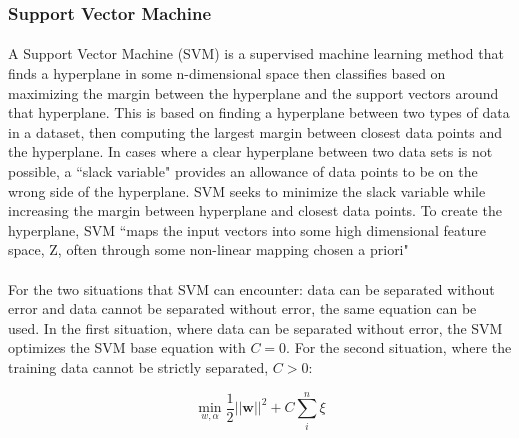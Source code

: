 \begin{comment}
			\paragraph*{}For this thesis, the counts from words in the Google Web1T corpus are used to smooth word counts in naive Bayes.  For example, the word ``dog" appears 3,450,297 time in the Web1T corpus, so the count for ``dog" is initialized to 3,450,297.  The denominator for a Google Web1T smooth naive Bayes instance is 1,024,908,267 based on total count weight of all tokens in the corpus.The specific details of the Google Web1T corpus are covered in a later section of this chapter.
\end{comment}
		\subsubsection{Support Vector Machine}
			\paragraph{}A Support Vector Machine (SVM) is a supervised machine learning method that finds a hyperplane in some n-dimensional space then classifies based on maximizing the margin between the hyperplane and the support vectors around that hyperplane.  This is based on finding a hyperplane between two types of data in a dataset, then computing the largest margin between closest data points and the hyperplane.  In cases where a clear hyperplane between two data sets is not possible, a ``slack variable" provides an allowance of data points to be on the wrong side of the hyperplane. SVM seeks to minimize the slack variable while increasing the margin between hyperplane and closest data points. To create the hyperplane, SVM ``maps the input vectors into some high dimensional feature space, Z, often through some non-linear mapping chosen a priori" \cite{vapnik_support-vector_1995}

			\paragraph{}For the two situations that SVM can encounter: data can be separated without error and data cannot be separated without error, the same equation can be used.  In the first situation, where data can be separated without error, the SVM optimizes the SVM base equation with $C=0$.  For the second situation, where the training data cannot be strictly separated, $C > 0$:
			
			\begin{equation} \min_{w,\alpha}\frac{1}{2}\mathbf{||w||}^2 + C \sum_i^n{\xi} 
			\end{equation}
			
